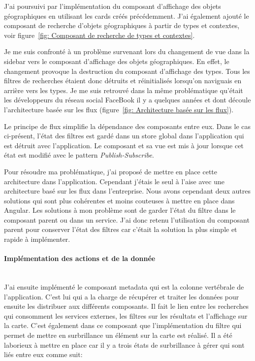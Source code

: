 \documentclass{rapportUHA40}
\begin{document}
J'ai poursuivi par l'implémentation du composant d'affichage des objets
géographiques en utilisant les cards créés précédemment. J'ai également ajouté
le composant de recherche d'objets géographiques à partir de types et
contextes, voir figure~\ref{fig: Composant de recherche de types et contextes}.

Je me suis confronté à un problème survenant lors du changement de vue dans la
sidebar vers le composant d'affichage des objets géographiques. En effet, le
changement provoque la destruction du composant d'affichage des types. Tous les
filtres de recherches étaient donc détruits et réinitialisés lorsqu'on
naviguais en arrière vers les types. Je me suis retrouvé dans la même
problématique qu'était les développeurs du réseau social FaceBook il y a
quelques années et dont découle l'architecture basée sur les flux
(figure~\ref{fig: Architecture basée sur les flux}).


Le principe de flux simplifie la dépendance des composants entre eux. Dans le
cas ci-présent, l'état des filtres est gardé dans un store global dans
l'application qui est détruit avec l'application. Le composant et sa vue est
mis à jour lorsque cet état est modifié avec le pattern
\textit{Publish-Subscribe}.

Pour résoudre ma problématique, j'ai proposé de mettre en place cette
architecture dans l'application. Cependant j'étais le seul à l'aise avec une
architecture basé sur les flux dans l'entreprise. Nous avons cependant deux
autres solutions qui sont plus cohérentes et moins couteuses à mettre en place
dans Angular. Les solutions à mon problème sont de garder l'état du filtre dans
le composant parent ou dans un service. J'ai donc retenu l'utilisation du
composant parent pour conserver l'état des filtres car c'était la solution la
plus simple et rapide à implémenter.\\

\paragraph{Implémentation des actions et de la donnée}\mbox{}\\
J'ai ensuite implémenté le composant metadata qui est la colonne vertébrale de
l'application. C'est lui qui a la charge de récupérer et traiter les données
pour ensuite les distribuer aux différents composants. Il fait le lien entre
les recherches qui consomment les services externes, les filtres sur les
résultats et l'affichage sur la carte. C'est également dans ce composant que
l'implémentation du filtre  \fg{} qui permet de mettre en
surbrillance un élément sur la carte est réalisé. Il a été laborieux à mettre
en place car il y a trois états de surbrillance à gérer qui sont liés entre eux
comme suit:
\end{document}
